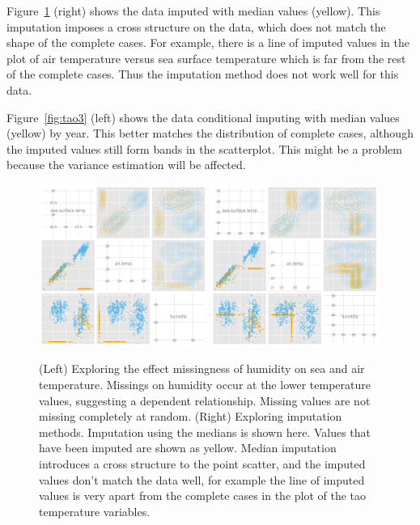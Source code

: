 \documentclass[article]{jss}
\begin{document}
Figure~\ref{fig:tao1} (right) shows the data imputed with median values (yellow). This imputation imposes a cross structure on the data, which does not match the shape of the complete cases. For example, there is a line of imputed values in the plot of air temperature versus sea surface temperature which is far from the rest of the complete cases. Thus the imputation method does not work well for this data.

Figure~\ref{fig:tao3} (left) shows the data conditional imputing with median values (yellow) by year. This better matches the distribution of complete cases, although the imputed values still form bands in the scatterplot. This might be a problem because the variance estimation will be affected. 


\begin{figure}[htp]
\centerline{\includegraphics[width=0.49\textwidth]{graph/fig4-3-below10-uncondition}
\includegraphics[width=0.49\textwidth]{graph/fig4-1-median-uncondition}}
\caption{(Left) Exploring the effect missingness of humidity on sea and air temperature. Missings on humidity occur at the lower temperature values, suggesting a dependent relationship. Missing values are not missing completely at random. (Right) Exploring imputation methods. Imputation using the medians is shown here. Values that have been imputed are shown as yellow. Median imputation introduces a cross structure to the point scatter, and the imputed values don't match the data well, for example the line of imputed values is very apart from the complete cases in the plot of the tao temperature variables.}
\label{fig:tao1}
\end{figure}
\end{document}
